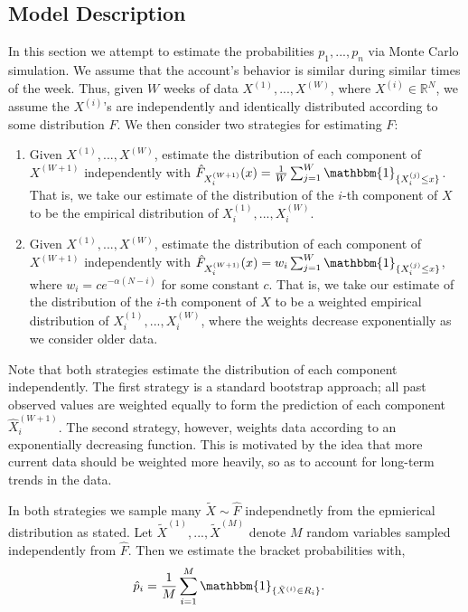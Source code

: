 \documentclass{article}
\begin{document}
\subsection{Model Description}
In this section we attempt to estimate the probabilities $p_1,...,p_n$ via Monte Carlo simulation.
We assume that the account's behavior is similar during similar times of the week. Thus, given $W$ weeks of data
$X^{(1)},...,X^{(W)}$, where $X^{(i)} \in \mathbb{R}^N$, we assume the $X^{(i)}$'s are independently and identically distributed according to
some distribution $F$. We then consider two strategies for estimating $F$:
\begin{enumerate}
    \item Given $X^{(1)},...,X^{(W)}$, estimate the distribution of each component of $X^{(W+1)}$ independently with
    $\hat{F}_{X_i^{(W+1)}}(x) = \frac{1}{W}\sum_{j=1}^W \mathbbm{1}_{\{X_i^{(j)} \leq x\}}$. That is, we take our estimate of the distribution of the $i$-th component of $X$
    to be the empirical distribution of $X_i^{(1)},...,X_i^{(W)}$.
    \item Given $X^{(1)},...,X^{(W)}$, estimate the distribution of each component of $X^{(W+1)}$ independently with
    $\hat{F}_{X_i^{(W+1)}}(x) = w_i\sum_{j=1}^W \mathbbm{1}_{\{X_i^{(j)} \leq x\}}$, where $w_i = ce^{-\alpha(N-i)}$ for some constant $c$. That is, we take our estimate of the distribution of the $i$-th component of $X$
    to be a weighted empirical distribution of $X_i^{(1)},...,X_i^{(W)}$, where the weights decrease exponentially as we consider older data.
\end{enumerate}
Note that both strategies estimate the distribution of each component independently. 
The first strategy is a standard bootstrap approach; all past observed values are weighted equally to form the prediction of each component $\hat{X}_i^{(W+1)}$.
The second strategy, however, weights data according to an exponentially decreasing function. This is motivated by the idea that more current data
should be weighted more heavily, so as to account for long-term trends in the data.

In both strategies we sample many $\tilde{X} \sim \hat{F}$ independnetly from the epmierical distribution as stated. Let
$\tilde{X}^{(1)},...,\tilde{X}^{(M)}$ denote $M$ random variables sampled independently from $\hat{F}$. Then we estimate the bracket probabilities with,
\begin{align*}
    \hat{p}_i &= \frac{1}{M}\sum_{i=1}^M \mathbbm{1}_{\{\tilde{X}^{(i)}  \in R_i\}}.
\end{align*}
\end{document}
